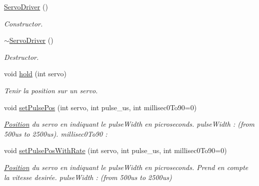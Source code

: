 \begin{DoxyCompactItemize}
\hyperlink{classServoDriver_a2076bae148e26ee3f854f1f1984d9714}{Servo\+Driver} ()
\begin{DoxyCompactList}\small\item\em Constructor. \end{DoxyCompactList}\item 
\mbox{\label{classServoDriver_acf6cad7d5b891fbe4ff44eaec8409db7}} 
\hyperlink{classServoDriver_acf6cad7d5b891fbe4ff44eaec8409db7}{$\sim$\+Servo\+Driver} ()
\begin{DoxyCompactList}\small\item\em Destructor. \end{DoxyCompactList}\item 
\mbox{\label{classServoDriver_af580283b3d1765c9a27276e9a870cf88}} 
void \hyperlink{classServoDriver_af580283b3d1765c9a27276e9a870cf88}{hold} (int servo)
\begin{DoxyCompactList}\small\item\em Tenir la position sur un servo. \end{DoxyCompactList}\item 
\mbox{\label{classServoDriver_ae467a0069a2dbc63c7bbd845f64c22ec}} 
void \hyperlink{classServoDriver_ae467a0069a2dbc63c7bbd845f64c22ec}{set\+Pulse\+Pos} (int servo, int pulse\+\_\+us, int millisec0\+To90=0)
\begin{DoxyCompactList}\small\item\em \hyperlink{structPosition}{Position} du servo en indiquant le pulse\+Width en picroseconds. pulse\+Width \+: (from 500us to 2500us). millisec0\+To90 \+: \end{DoxyCompactList}\item 
\mbox{\label{classServoDriver_ac5f65b3e6eb75e1cd36314e5f1d012a6}} 
void \hyperlink{classServoDriver_ac5f65b3e6eb75e1cd36314e5f1d012a6}{set\+Pulse\+Pos\+With\+Rate} (int servo, int pulse\+\_\+us, int millisec0\+To90=0)
\begin{DoxyCompactList}\small\item\em \hyperlink{structPosition}{Position} du servo en indiquant le pulse\+Width en picroseconds. Prend en compte la vitesse desirée. pulse\+Width \+: (from 500us to 2500us) \end{DoxyCompactList}\item 
\mbox{\label{classServoDriver_a8e814adc1cec6f810bcd58ade3168c3d}} 

\end{DoxyCompactItemize}
